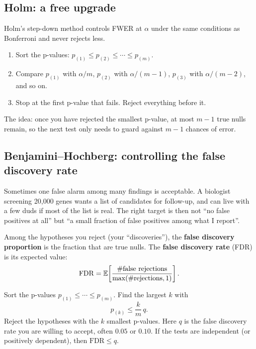 \subsection{Holm: a free upgrade}

Holm's step-down method controls FWER at $\alpha$ under the same conditions as
Bonferroni and never rejects less.

\begin{enumerate}
\item Sort the p-values: $p_{(1)}\le p_{(2)}\le\cdots\le p_{(m)}$.
\item Compare $p_{(1)}$ with $\alpha/m$, $p_{(2)}$ with $\alpha/(m-1)$, $p_{(3)}$
  with $\alpha/(m-2)$, and so on.
\item Stop at the first p-value that fails. Reject everything before it.
\end{enumerate}

The idea: once you have rejected the smallest p-value, at most $m-1$ true nulls
remain, so the next test only needs to guard against $m-1$ chances of error.

\subsection{Benjamini--Hochberg: controlling the false discovery rate}

Sometimes one false alarm among many findings is acceptable. A biologist
screening 20{,}000 genes wants a list of candidates for follow-up, and can live
with a few duds if most of the list is real. The right target is then not ``no
false positives at all'' but ``a small fraction of false positives among what I
report''.

\begin{definition}
Among the hypotheses you reject (your ``discoveries''), the
\textbf{false discovery proportion} is the fraction that are true nulls.
The \textbf{false discovery rate} (FDR) is its expected value:
\[
  \mathrm{FDR}=\operatorname{\mathbb{E}}\!\left[\frac{\#\text{false rejections}}{\max(\#\text{rejections},1)}\right].
\]
\end{definition}

\begin{theorem}
Sort the p-values $p_{(1)}\le\cdots\le p_{(m)}$. Find the largest $k$ with
\[
  p_{(k)}\le \frac{k}{m}\,q.
\]
Reject the hypotheses with the $k$ smallest p-values. Here $q$ is the false
discovery rate you are willing to accept, often $0.05$ or $0.10$. If the tests are independent
(or positively dependent), then $\mathrm{FDR}\le q$.
\end{theorem}


